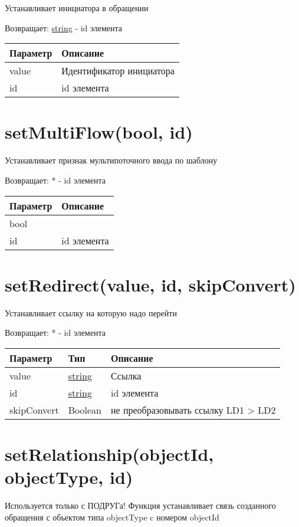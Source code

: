 Устанавливает инициатора в обращении

Возвращает: \protect\hyperlink{string}{string} - id элемента

\begin{longtable}[]{@{}ll@{}}
\toprule
Параметр & Описание\tabularnewline
\midrule
\endhead
value & Идентификатор инициатора\tabularnewline
id & id элемента\tabularnewline
\bottomrule
\end{longtable}

\hypertarget{setmultiflowbool-id}{%
\section{setMultiFlow(bool, id)}\label{setmultiflowbool-id}}

Устанавливает признак мультипоточного ввода по шаблону

Возвращает: * - id элемента

\begin{longtable}[]{@{}ll@{}}
\toprule
Параметр & Описание\tabularnewline
\midrule
\endhead
bool &\tabularnewline
id & id элемента\tabularnewline
\bottomrule
\end{longtable}

\hypertarget{setredirectvalue-id-skipconvert}{%
\section{setRedirect(value, id, skipConvert)}\label{setredirectvalue-id-skipconvert}}

Устанавливает ссылку на которую надо перейти

Возвращает: * - id элемента

\begin{longtable}[]{@{}lll@{}}
\toprule
Параметр & Тип & Описание\tabularnewline
\midrule
\endhead
value & \protect\hyperlink{string}{string} & Ссылка\tabularnewline
id & \protect\hyperlink{string}{string} & id элемента\tabularnewline
skipConvert & Boolean & не преобразовывать ссылку LD1 \textgreater{}
LD2\tabularnewline
\bottomrule
\end{longtable}

\hypertarget{setrelationshipobjectid-objecttype-id}{%
\section{setRelationship(objectId, objectType, id)}\label{setrelationshipobjectid-objecttype-id}}

Используется только с ПОДРУГа! Функция устанавливает связь созданного
обращения с обьектом типа objectType c номером objectId

